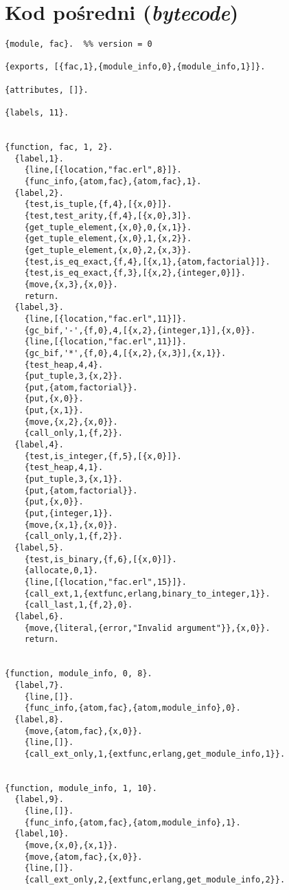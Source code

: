 \section{Kod pośredni (\emph{bytecode})}
\begin{lstlisting}[style=erlang, caption=\emph{Bytecode} modułu fac, label=facS]
{module, fac}.  %% version = 0

{exports, [{fac,1},{module_info,0},{module_info,1}]}.

{attributes, []}.

{labels, 11}.


{function, fac, 1, 2}.
  {label,1}.
    {line,[{location,"fac.erl",8}]}.
    {func_info,{atom,fac},{atom,fac},1}.
  {label,2}.
    {test,is_tuple,{f,4},[{x,0}]}.
    {test,test_arity,{f,4},[{x,0},3]}.
    {get_tuple_element,{x,0},0,{x,1}}.
    {get_tuple_element,{x,0},1,{x,2}}.
    {get_tuple_element,{x,0},2,{x,3}}.
    {test,is_eq_exact,{f,4},[{x,1},{atom,factorial}]}.
    {test,is_eq_exact,{f,3},[{x,2},{integer,0}]}.
    {move,{x,3},{x,0}}.
    return.
  {label,3}.
    {line,[{location,"fac.erl",11}]}.
    {gc_bif,'-',{f,0},4,[{x,2},{integer,1}],{x,0}}.
    {line,[{location,"fac.erl",11}]}.
    {gc_bif,'*',{f,0},4,[{x,2},{x,3}],{x,1}}.
    {test_heap,4,4}.
    {put_tuple,3,{x,2}}.
    {put,{atom,factorial}}.
    {put,{x,0}}.
    {put,{x,1}}.
    {move,{x,2},{x,0}}.
    {call_only,1,{f,2}}.
  {label,4}.
    {test,is_integer,{f,5},[{x,0}]}.
    {test_heap,4,1}.
    {put_tuple,3,{x,1}}.
    {put,{atom,factorial}}.
    {put,{x,0}}.
    {put,{integer,1}}.
    {move,{x,1},{x,0}}.
    {call_only,1,{f,2}}.
  {label,5}.
    {test,is_binary,{f,6},[{x,0}]}.
    {allocate,0,1}.
    {line,[{location,"fac.erl",15}]}.
    {call_ext,1,{extfunc,erlang,binary_to_integer,1}}.
    {call_last,1,{f,2},0}.
  {label,6}.
    {move,{literal,{error,"Invalid argument"}},{x,0}}.
    return.


{function, module_info, 0, 8}.
  {label,7}.
    {line,[]}.
    {func_info,{atom,fac},{atom,module_info},0}.
  {label,8}.
    {move,{atom,fac},{x,0}}.
    {line,[]}.
    {call_ext_only,1,{extfunc,erlang,get_module_info,1}}.


{function, module_info, 1, 10}.
  {label,9}.
    {line,[]}.
    {func_info,{atom,fac},{atom,module_info},1}.
  {label,10}.
    {move,{x,0},{x,1}}.
    {move,{atom,fac},{x,0}}.
    {line,[]}.
    {call_ext_only,2,{extfunc,erlang,get_module_info,2}}.
\end{lstlisting}


